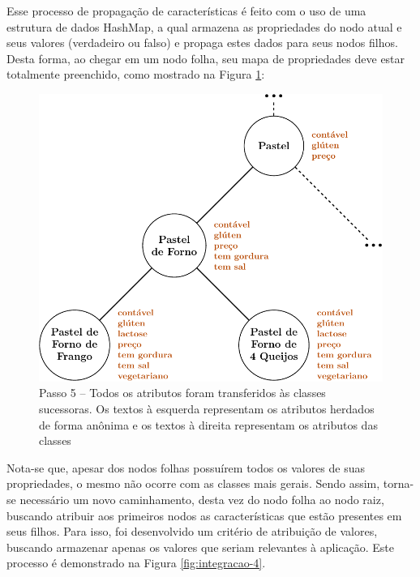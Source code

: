 Esse processo de propagação de características é feito com o uso de uma estrutura de dados HashMap, a qual armazena as propriedades do nodo atual e seus valores (verdadeiro ou falso) e propaga estes dados para seus nodos filhos. Desta forma, ao chegar em um nodo folha, seu mapa de propriedades deve estar totalmente preenchido, como mostrado na Figura \ref{fig:integracao-3}:

\begin{figure}[H]
	\centering
	\caption[Integração da Ontologia -- Passo 5]{Passo 5 -- Todos os atributos foram transferidos às classes sucessoras. Os textos à esquerda representam os atributos herdados de forma anônima e os textos à direita representam os atributos das classes}
	\label{fig:integracao-3}
	\includegraphics[width=0.55\linewidth]{./pdf/tikz/topdown-5.pdf}
\end{figure}

Nota-se que, apesar dos nodos folhas possuírem todos os valores de suas propriedades, o mesmo não ocorre com as classes mais gerais. Sendo assim, torna-se necessário um novo caminhamento, desta vez do nodo folha ao nodo raiz, buscando atribuir aos primeiros nodos as características que estão presentes em seus filhos. Para isso, foi desenvolvido um critério de atribuição de valores, buscando armazenar apenas os valores que seriam relevantes à aplicação. Este processo é demonstrado na Figura \ref{fig:integracao-4}. 

